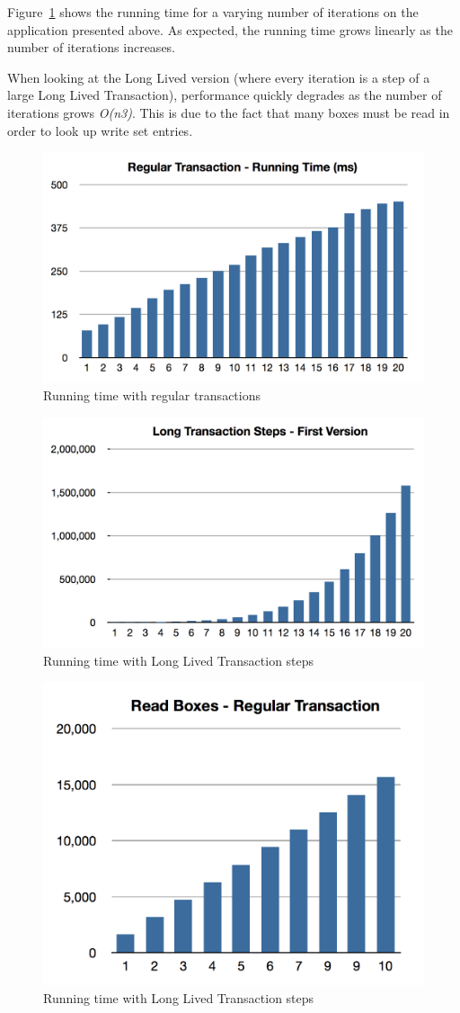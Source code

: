 Figure~\ref{fig:regTime} shows the running time for a varying number
of iterations on the application presented above. As expected, the
running time grows linearly as the number of iterations increases.

When looking at the Long Lived version (where every iteration is a
step of a large Long Lived Transaction), performance quickly degrades
as the number of iterations grows {\it O(n3)}. This is due to the fact
that many boxes must be read in order to look up write set entries.

\begin{figure}
\centering
\includegraphics[width=0.7\linewidth]{reg-time}
\caption{Running time with regular transactions}
\label{fig:regTime}
\end{figure}

\begin{figure}
\centering
\includegraphics[width=0.7\linewidth]{long-time-v1}
\caption{Running time with Long Lived Transaction steps}
\end{figure}

\begin{figure}
\centering
\includegraphics[width=0.6\linewidth]{reg-box}
\caption{Running time with Long Lived Transaction steps}
\end{figure}

